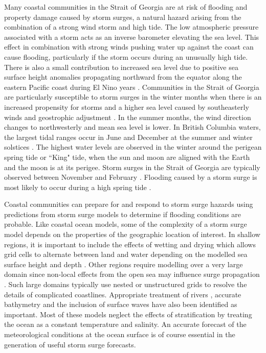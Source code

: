 \documentclass[letterpaper]{tATO2e}
\begin{document}
Many coastal communities in the Strait of Georgia are at risk of flooding and property damage caused by storm surges, a natural hazard arising from the combination of a strong wind storm and high tide. The low atmospheric pressure associated with a storm acts as an inverse barometer elevating the sea level. This effect in combination with strong winds pushing water up against the coast can cause flooding, particularly if the storm occurs during an unusually high tide.  There is also a small contribution to increased sea level due to positive sea surface height anomalies propagating northward from the equator along the eastern Pacific coast during El Nino years \citep{strub2002altimeter}. Communities in the Strait of Georgia are particularly susceptible to storm surges in the winter months when there is an increased propensity for storms and a higher sea level caused by southeasterly winds and geostrophic adjustment \citep{danard2003storm}. In the summer months, the wind direction changes to northwesterly and mean sea level is lower. In British Columbia waters, the largest tidal ranges occur in June and December at the summer and winter solstices \citep{thomson1981oceanography}. The highest water levels are observed in the winter around the perigean spring tide or ``King" tide, when the sun and moon are aligned with the Earth and the moon is at its perigee. Storm surges in the Strait of Georgia are typically observed between November and February \citep{forseth2006adaptation}. Flooding caused by a storm surge is most likely to occur during a high spring tide \citep{abeys2011extreme}. 

Coastal communities can prepare for and respond to storm surge hazards using predictions from storm surge models to determine if flooding conditions are probable. Like coastal ocean models, some of the complexity of a storm surge model depends on the properties of the geographic location of interest. In shallow regions, it is important to include the effects of wetting and drying which allows grid cells to alternate between land and water depending on the modelled sea surface height and depth \citep{hubbert1999storm, weisberg2006hurricane}.  Other regions require modelling over a very large domain since non-local effects from the open sea may influence surge propagation \citep{mercer2002barotropic, weisberg2006hurricane, lane2009verification}. Such large domains typically use nested or unstructured grids to resolve the details of complicated coastlines. Appropriate treatment of rivers \citep{flather1994storm}, accurate bathymetry and the inclusion {\color{red} of} surface waves \citep{xu2010storm} have also been identified as important.  Most of these models neglect the effects of stratification by treating the ocean as a constant temperature and salinity. An accurate forecast of the meteorological conditions at the ocean surface is of course essential in the generation of useful storm surge forecasts.
\end{document}
